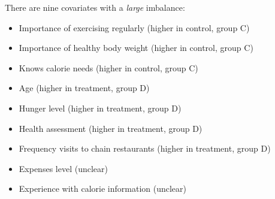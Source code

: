 \begin{enumerate}
  There are nine covariates with a \emph{large} imbalance:
  \begin{itemize}
    \item Importance of exercising regularly (higher in control, group C)
    \item Importance of healthy body weight (higher in control, group C)
    \item Knows calorie needs (higher in control, group C)
    \item Age (higher in treatment, group D)
    \item Hunger level (higher in treatment, group D)
    \item Health assessment (higher in treatment, group D)
    \item Frequency visits to chain restaurants (higher in treatment, group D)
    \item Expenses level (unclear)
    \item Experience with calorie information (unclear)
  \end{itemize}

\end{enumerate}
